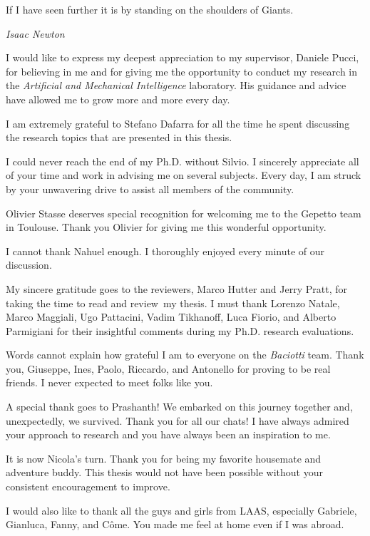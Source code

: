 
\begin{acknowledgements}      

\epigraph{If I have seen further it is by standing on the shoulders of Giants.}{\textit{Isaac Newton}}

I would like to express my deepest appreciation to my supervisor, Daniele Pucci, for believing in me and for giving me the opportunity to conduct my research in the \emph{Artificial and Mechanical Intelligence} laboratory. His guidance and advice have allowed me to grow more and more every day.

I am extremely grateful to Stefano Dafarra for all the time he spent discussing the research topics that are presented in this thesis. 

I could never reach the end of my Ph.D. without Silvio. I sincerely appreciate all of your time and work in advising me on several subjects. Every day, I am struck by your unwavering drive to assist all members of the community.

Olivier Stasse deserves special recognition for welcoming me to the Gepetto team in Toulouse. Thank you Olivier for giving me this wonderful opportunity. 

I cannot thank Nahuel enough. I thoroughly enjoyed every minute of our discussion.

My sincere gratitude goes to the reviewers, Marco Hutter and Jerry Pratt, for taking the time to read and review my thesis. I must thank Lorenzo Natale, Marco Maggiali, Ugo Pattacini, Vadim Tikhanoff, Luca Fiorio, and Alberto Parmigiani for their insightful comments during my Ph.D. research evaluations.

Words cannot explain how grateful I am to everyone on the \emph{Baciotti} team. Thank you, Giuseppe, Ines, Paolo, Riccardo, and Antonello for proving to be real friends. I never expected to meet folks like you.

A special thank goes to Prashanth! We embarked on this journey together and, unexpectedly, we survived. Thank you for all our chats! I have always admired your approach to research and you have always been an inspiration to me.

It is now Nicola's turn. Thank you for being my favorite housemate and adventure buddy. This thesis would not have been possible without your consistent encouragement to improve.

I would also like to thank all the guys and girls from LAAS, especially Gabriele, Gianluca, Fanny, and Côme. You made me feel at home even if I was abroad. 


\end{acknowledgements}
